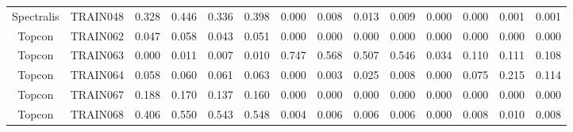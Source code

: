 \begin{table}[!ht]
{\begin{tabular}{|c|c|cccc|cccc|cccc|}
		Spectralis & TRAIN048 & 0.328 & 0.446 & 0.336 & 0.398 & 0.000 & 0.008 & 0.013 & 0.009 & 0.000 & 0.000 & 0.001 & 0.001 \\

		Topcon & TRAIN062 & 0.047 & 0.058 & 0.043 & 0.051 & 0.000 & 0.000 & 0.000 & 0.000 & 0.000 & 0.000 & 0.000 & 0.000 \\

		Topcon & TRAIN063 & 0.000 & 0.011 & 0.007 & 0.010 & 0.747 & 0.568 & 0.507 & 0.546 & 0.034 & 0.110 & 0.111 & 0.108 \\
		
		Topcon & TRAIN064 & 0.058 & 0.060 & 0.061 & 0.063 & 0.000 & 0.003 & 0.025 & 0.008 & 0.000 & 0.075 & 0.215 & 0.114 \\

		Topcon & TRAIN067 & 0.188 & 0.170 & 0.137 & 0.160 & 0.000 & 0.000 & 0.000 & 0.000 & 0.000 & 0.000 & 0.000 & 0.000 \\

		Topcon & TRAIN068 & 0.406 & 0.550 & 0.543 & 0.548 & 0.004 & 0.006 & 0.006 & 0.006 & 0.000 & 0.008 & 0.010 & 0.008 \\
		
		\hline
		
	\end{tabular}}
	\label{tab:FluidVolumesExperiment6}
\end{table}